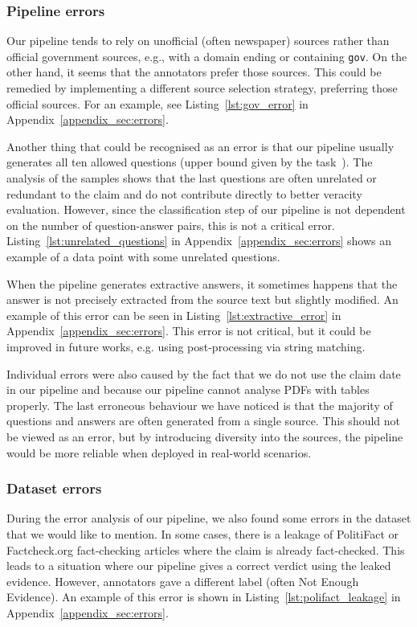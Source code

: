 \subsubsection{Pipeline errors}
Our pipeline tends to rely on unofficial (often newspaper) sources rather than official government sources, e.g., with a domain ending or containing \texttt{gov}. On the other hand, it seems that the annotators prefer those sources. This could be remedied by implementing a different source selection strategy, preferring those official sources. For an example, see Listing~\ref{lst:gov_error} {in Appendix~\ref{appendix_sec:errors}}.

Another thing that could be recognised as an error is that our pipeline usually generates all ten allowed questions (upper bound given by the task~\cite{averitec2024}). The analysis of the samples shows that the last questions are often unrelated or redundant to the claim and do not contribute directly to better veracity evaluation. However, since the classification step of our pipeline is not dependent on the number of question-answer pairs, this is not a critical error.
Listing~\ref{lst:unrelated_questions} {in Appendix~\ref{appendix_sec:errors}} shows an example of a {data point} with some unrelated questions.

When the pipeline generates extractive answers, it sometimes happens that the answer is not precisely extracted from the source text but slightly modified. An example of this error can be seen in Listing~\ref{lst:extractive_error} {in Appendix~\ref{appendix_sec:errors}}. This error is not critical, but it could be improved in future works, e.g. using post-processing via string matching.

Individual errors were also caused by the fact that we do not use the claim date in our pipeline and because our pipeline cannot analyse PDFs with tables properly. The last erroneous behaviour we have noticed is that the majority of questions and answers are often generated from a single source. This should not be viewed as an error, but by introducing diversity into the sources, the pipeline would be more reliable when deployed in real-world scenarios.

\subsubsection{Dataset errors}
During the error analysis of our pipeline, we also found some errors in the \averitec{} dataset that we would like to mention. In some cases, there is a leakage of PolitiFact {or Factcheck.org} fact-checking articles where the claim is already fact-checked. This leads to a situation where our pipeline gives a correct verdict using the leaked evidence. However, annotators gave a different label (often Not Enough Evidence). {An example of this error is shown in Listing~\ref{lst:polifact_leakage} in Appendix~\ref{appendix_sec:errors}}. 

